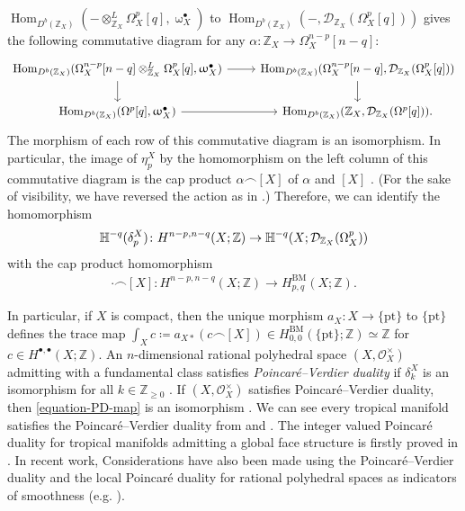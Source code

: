 \documentclass[a4paper,dvipdfmx,reqno,12pt]{amsart}
\theoremstyle{definition}
\newcommand{\deq}{\coloneqq}
\newcommand{\opn}[1]{\operatorname{#1}}
\numberwithin{equation}{section}
\begin{document}
\noindent
$\opn{Hom}_{D^{b}(\mathbb{Z}_X)}(- 
\otimes^{L}_{\mathbb{Z}_X} \Omega_X^{p}[q],
\upomega_X^{\bullet})$ to
$\opn{Hom}_{D^{b}(\mathbb{Z}_X)}(-,
\mathcal{D}_{\mathbb{Z}_X}(\Omega_X^{p}[q]))$
gives the following commutative diagram
for any 
$\alpha \colon \mathbb{Z}_X\to \Omega_X^{n-p}[n-q]$:
\[\begin{tikzcd}
{\opn{Hom}_{D^{b}(\mathbb{Z}_X)}(\Omega_X^{n-p}[n-q]
\otimes^{L}_{\mathbb{Z}_X} \Omega_X^{p}[q]
,\upomega_X^{\bullet})} & 
{\opn{Hom}_{D^{b}(\mathbb{Z}_X)}
(\Omega_X^{n-p}[n-q],\mathcal{D}_{\mathbb{Z}_X}(\Omega_X^{p}[q]))} \\
{\opn{Hom}_{D^{b}(\mathbb{Z}_X)}(\Omega^{p}[q],
\upomega_X^{\bullet})} & {\opn{Hom}_{D^{b}(\mathbb{Z}_X)}(\mathbb{Z}_X,\mathcal{D}_{\mathbb{Z}_X}(\Omega^{p}[q]))}.
	\arrow[from=1-2, to=2-2]
	\arrow[from=2-1, to=2-2]
	\arrow[from=1-1, to=1-2]
	\arrow[from=1-1, to=2-1]
\end{tikzcd}\]
The morphism of each row of
this commutative diagram is an isomorphism.
In particular,
the image of $\eta^X_{p}$ by the homomorphism
on the left column of this commutative diagram
is the cap product $\alpha\frown [X]$
of $\alpha$ and $[X]$ \cite[]{MR4637248}.
(For the sake of visibility, we have reversed 
the action as in \cite[]{MR4637248}.)
Therefore, we can identify
the homomorphism
\begin{align}
\mathbb{H}^{-q}(\delta_p^{X})
\colon H^{n-p,n-q}(X;\mathbb{Z})
\to \mathbb{H}^{-q}(X;\mathcal{D}_{\mathbb{Z}_X}
(\Omega_X^{p})) \notag
\end{align}
with the cap product homomorphism
\begin{align}
\label{equation-PD-map}
\cdot \frown [X]
\colon H^{n-p,n-q}(X;\mathbb{Z})
\to
H^{\mathrm{BM}}_{p,q}(X;\mathbb{Z}).
\end{align}

In particular, if $X$ is compact,
then the unique morphism 
$a_X\colon X\to \{\mathrm{pt}\}$
to $\{\mathrm{pt}\}$
defines the trace map
$\int_X c\deq a_{X*}(c\frown [X])\in 
H_{0,0}^{\mathrm{BM}}(\{\mathrm{pt}\};\mathbb{Z})
\simeq \mathbb{Z}$ for
$c\in H^{\bullet,\bullet}(X;\mathbb{Z})$.
An $n$-dimensional rational polyhedral space
$(X,\mathcal{O}_X^{\times})$
admitting with a fundamental class satisfies
\emph{Poincar\'e--Verdier duality} if 
$\delta_{k}^{X}$ is an isomorphism for all
$k\in \mathbb{Z}_{\geq 0}$
\cite[Definition 6.4]{MR4637248}.
If $(X,\mathcal{O}_X^{\times})$ satisfies 
Poincar\'e--Verdier duality, then
\cref{equation-PD-map} is an isomorphism
\cite[Coroolary 6.9]{MR4637248}.
We can see every tropical manifold
satisfies the Poincar\'e--Verdier duality
from \cite[Proposition 5.5]{MR3894860} and
\cite[Theorem 6.7]{MR4637248}.
The integer valued Poincar\'e duality for tropical manifolds
admitting a global face structure is firstly proved in
\cite[Theorem 5.3]{MR3894860}.
In recent work,
Considerations have also been made using the Poincar\'e--Verdier duality
and the local Poincar\'e duality for rational polyhedral
spaces as indicators of smoothness
(e.g. \cite{MR4626316,amini2021homology,MR4246795}). 
\end{document}
